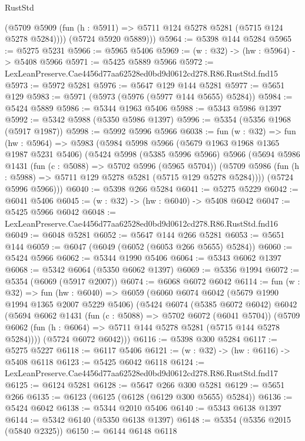 \begin{lexlean}{RustStd}
\begin{coremodule}
          (@5709 @5909 (fun (h : @5911) => @5711 @124 @5278 @5281 (@5715 @124 @5278 @5284))))
        (@5724 @5920 @5889)))
@5964 := @5398 @144 @5284
@5965 := @5275 @5231
@5966 := @5965 @5406
@5969 := (w : @32) -> (hw : @5964) -> @5408 @5966
@5971 := @5425 @5889 @5966
@5972 := LexLeanPreserve.Cae4456d77aa62528ed0bd9d0612cd278.R86.RustStd.fnd15
@5973 := @5972 @5281
@5976 := @5647 @129 @144 @5281
@5977 := @5651 @129
@5983 := @5971 (@5973 (@5976 (@5977 @144 @5655) @5284))
@5984 := @5424 @5889
@5986 := @5344 @1963 @5406
@5988 := @5343 @5986 @1397
@5992 := @5342 @5988 (@5350 @5986 @1397)
@5996 := @5354 (@5356 @1968 (@5917 @1987))
@5998 := @5992 @5996 @5966
@6038 := fun (w : @32) =>
  fun (hw : @5964) =>
  @5983
    (@5984
      @5998
      @5966
      (@5679 @1963 @1968 @1365 @1987 @5231 @5406)
      (@5424
        @5998
        (@5385 @5996 @5966)
        @5966
        (@5694
          @5986
          @1431
          (fun (c : @5088) => @5702 @5996 (@5965 @5704))
          (@5709 @5986 (fun (h : @5988) => @5711 @129 @5278 @5281 (@5715 @129 @5278 @5284))))
        (@5724 @5996 @5966)))
@6040 := @5398 @266 @5284
@6041 := @5275 @5229
@6042 := @6041 @5406
@6045 := (w : @32) -> (hw : @6040) -> @5408 @6042
@6047 := @5425 @5966 @6042
@6048 := LexLeanPreserve.Cae4456d77aa62528ed0bd9d0612cd278.R86.RustStd.fnd16
@6049 := @6048 @5281
@6052 := @5647 @144 @266 @5281
@6053 := @5651 @144
@6059 := @6047 (@6049 (@6052 (@6053 @266 @5655) @5284))
@6060 := @5424 @5966
@6062 := @5344 @1990 @5406
@6064 := @5343 @6062 @1397
@6068 := @5342 @6064 (@5350 @6062 @1397)
@6069 := @5356 @1994
@6072 := @5354 (@6069 (@5917 @2007))
@6074 := @6068 @6072 @6042
@6114 := fun (w : @32) =>
  fun (hw : @6040) =>
  @6059
    (@6060
      @6074
      @6042
      (@5679 @1990 @1994 @1365 @2007 @5229 @5406)
      (@5424
        @6074
        (@5385 @6072 @6042)
        @6042
        (@5694
          @6062
          @1431
          (fun (c : @5088) => @5702 @6072 (@6041 @5704))
          (@5709 @6062 (fun (h : @6064) => @5711 @144 @5278 @5281 (@5715 @144 @5278 @5284))))
        (@5724 @6072 @6042)))
@6116 := @5398 @300 @5284
@6117 := @5275 @5227
@6118 := @6117 @5406
@6121 := (w : @32) -> (hw : @6116) -> @5408 @6118
@6123 := @5425 @6042 @6118
@6124 := LexLeanPreserve.Cae4456d77aa62528ed0bd9d0612cd278.R86.RustStd.fnd17
@6125 := @6124 @5281
@6128 := @5647 @266 @300 @5281
@6129 := @5651 @266
@6135 := @6123 (@6125 (@6128 (@6129 @300 @5655) @5284))
@6136 := @5424 @6042
@6138 := @5344 @2010 @5406
@6140 := @5343 @6138 @1397
@6144 := @5342 @6140 (@5350 @6138 @1397)
@6148 := @5354 (@5356 @2015 (@5840 @2325))
@6150 := @6144 @6148 @6118

\end{coremodule}
\end{lexlean}
